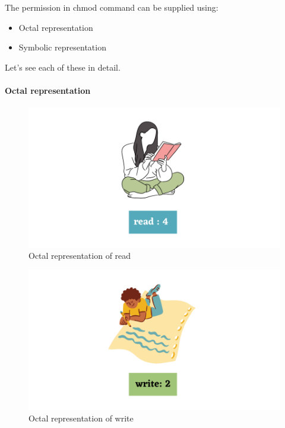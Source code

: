 \begin{flushleft}
	The permission in chmod command can be supplied using:
	\begin{itemize}
		\item Octal representation
		\item Symbolic representation
	\end{itemize}

	Let's see each of these in detail.

\newpage
\paragraph{Octal representation}

\begin{figure}[h!]
	\centering
	\includegraphics[scale=0.4]{content/chapter5/images/67.png}
	\caption{Octal representation of read}
	\label{fig:read}
\end{figure}

\begin{figure}[h!]
	\centering
	\includegraphics[scale=0.4]{content/chapter5/images/68.png}
	\caption{Octal representation of write}
	\label{fig:write}
\end{figure}


\end{flushleft}
